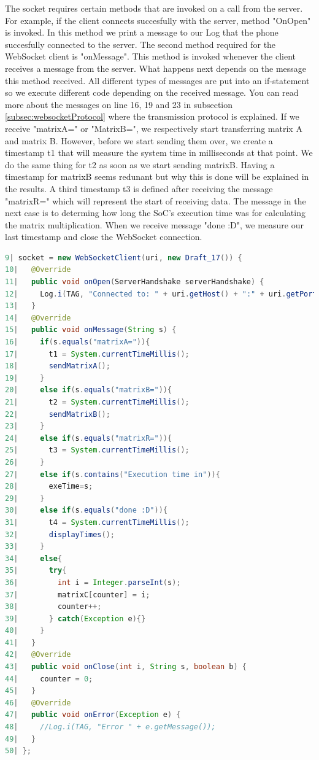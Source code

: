 \documentclass[a4paper, 11pt]{report}
\begin{document}
The socket requires certain methods that are invoked on a call from the server. For example, if the client connects succesfully with the server, method "OnOpen" is invoked. In this method we print a message to our Log that the phone succesfully connected to the server. The second method required for the WebSocket client is "onMessage". This method is invoked whenever the client receives a message from the server. What happens next depends on the message this method received. All different types of messages are put into an if-statement so we execute different code depending on the received message. You can read more about the messages on line 16, 19 and 23 in subsection \ref{subsec:websocketProtocol} where the transmission protocol is explained. If we receive "matrixA=" or "MatrixB=", we respectively start transferring matrix A and matrix B. However, before we start sending them over, we create a timestamp t1 that will measure the system time in milliseconds at that point. We do the same thing for t2 as soon as we start sending matrixB. Having a timestamp for matrixB seems redunant but why this is done will be explained in the results. A third timestamp t3 is defined after receiving the message "matrixR=" which will represent the start of receiving data. The message in the next case is to determing how long the SoC's execution time was for calculating the matrix multiplication. When we receive message "done :D", we measure our last timestamp and close the WebSocket connection.

\begin{lstlisting}[caption={Detailed look at creating the WebSocket client},captionpos=b, label={lst:detailWebSocketClient}, language=java, float=h]
 9| socket = new WebSocketClient(uri, new Draft_17()) {
10|   @Override
11|   public void onOpen(ServerHandshake serverHandshake) {
12|     Log.i(TAG, "Connected to: " + uri.getHost() + ":" + uri.getPort());
13|   }
14|   @Override
15|   public void onMessage(String s) {
16|     if(s.equals("matrixA=")){
17|       t1 = System.currentTimeMillis();
18|       sendMatrixA();
19|     }
20|     else if(s.equals("matrixB=")){
21|       t2 = System.currentTimeMillis();
22|       sendMatrixB();
23|     }
24|     else if(s.equals("matrixR=")){
25|       t3 = System.currentTimeMillis();
26|     }
27|     else if(s.contains("Execution time in")){
28|       exeTime=s;
29|     }
30|     else if(s.equals("done :D")){
31|       t4 = System.currentTimeMillis();
32|       displayTimes();
33|     }
34|     else{
35|       try{
36|         int i = Integer.parseInt(s);
37|         matrixC[counter] = i;
38|         counter++;
39|       } catch(Exception e){}
40|     }
41|   }
42|   @Override
43|   public void onClose(int i, String s, boolean b) {
44|     counter = 0;
45|   }
46|   @Override
47|   public void onError(Exception e) {
48|     //Log.i(TAG, "Error " + e.getMessage());
49|   }
50| };
\end{lstlisting}
\end{document}
